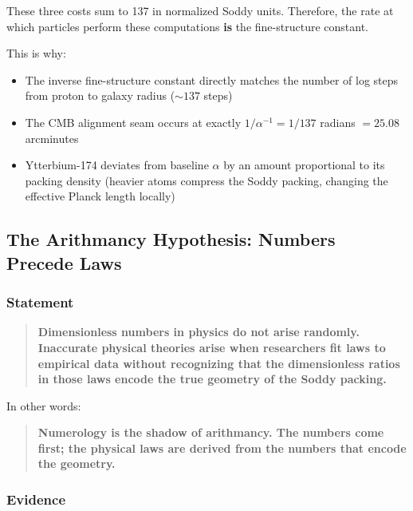 \documentclass[11pt,a4paper]{article}
\begin{document}
These three costs sum to 137 in normalized Soddy units. Therefore, the rate at which particles perform these computations \textbf{is} the fine-structure constant.

This is why:
\begin{itemize}
\item The inverse fine-structure constant directly matches the number of log steps from proton to galaxy radius ($\sim 137$ steps)
\item The CMB alignment seam occurs at exactly $1/\alpha^{-1} = 1/137$ radians $= 25.08$ arcminutes
\item Ytterbium-174 deviates from baseline $\alpha$ by an amount proportional to its packing density (heavier atoms compress the Soddy packing, changing the effective Planck length locally)
\end{itemize}


\subsection{The Arithmancy Hypothesis: Numbers Precede Laws}

\subsubsection{Statement}

\begin{quote}
\textbf{Dimensionless numbers in physics do not arise randomly. Inaccurate physical theories arise when researchers fit laws to empirical data without recognizing that the dimensionless ratios in those laws encode the true geometry of the Soddy packing.}
\end{quote}

In other words:

\begin{quote}
\textbf{Numerology is the shadow of arithmancy. The numbers come first; the physical laws are derived from the numbers that encode the geometry.}
\end{quote}

\subsubsection{Evidence}
\end{document}
